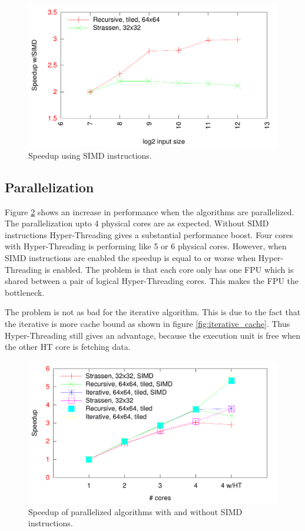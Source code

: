 \begin{figure}[h!]
  \centering
  \includegraphics[width=\textwidth]{"../project2/gnuplots/simd_performance"}
  \caption{Speedup using SIMD instructions.}
  \label{fig:simd}
\end{figure}

\subsection{Parallelization}

Figure \ref{fig:parallel_speedup} shows an increase in performance when the algorithms are parallelized. The parallelization upto 4 physical cores are as expected. Without SIMD instructions Hyper-Threading gives a substantial performance boost. Four cores with Hyper-Threading is performing like 5 or 6 physical cores. However, when SIMD instructions are enabled the speedup is equal to or worse when Hyper-Threading is enabled. The problem is that each core only has one FPU \cite{IntelHT} which is shared between a pair of logical Hyper-Threading cores. This makes the FPU the bottleneck.

The problem is not as bad for the iterative algorithm. This is due to the fact that the iterative is more cache bound as shown in figure \ref{fig:iterative_cache}. Thus Hyper-Threading still gives an advantage, because the execution unit is free when the other HT core is fetching data.

\begin{figure}[h!]
  \centering
  \includegraphics[width=\textwidth]{"../project2/gnuplots/parallel_speedup"}
  \caption{Speedup of parallelized algorithms with and without SIMD instructions.}
  \label{fig:parallel_speedup}
\end{figure}

